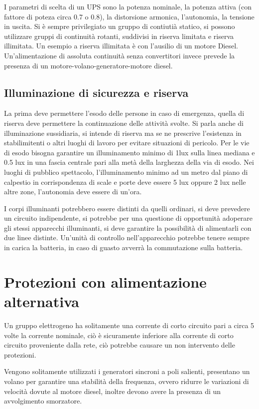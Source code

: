 I parametri di scelta di un UPS sono la potenza nominale, la potenza attiva 
(con fattore di poteza circa 0.7 o 0.8), la distorsione armonica, l'autonomia, 
la tensione in uscita.
Si è sempre privilegiato un gruppo di contiutià statico, si possono utilizzare 
gruppi di continuità rotanti, suddivisi in riserva limitata e riserva 
illimitata. Un esempio a riserva illimitata è con l'ausilio di un motore Diesel.
Un'alimentazione di assoluta continuità senza convertitori invece prevede la 
presenza di un motore-volano-generatore-motore diesel.

\subsection{Illuminazione di sicurezza e riserva}
La prima deve permettere l'esodo delle persone in caso di emergenza, quella di 
riserva deve permettere la continuazione delle attività svolte.
Si parla anche di illuminazione sussidiaria, si intende di riserva ma se ne 
prescrive l'esistenza in stabilimitenti o altri luoghi di lavoro per evitare 
situazioni di pericolo.
Per le vie di esodo bisogna garantire un illuminamento minimo di 1lux sulla 
linea mediana e 0.5 lux in una fascia centrale pari alla metà della larghezza 
della via di esodo. Nei luoghi di pubblico spettacolo, l'illuminamento minimo 
ad un metro dal piano di calpestio in corrispondenza di scale e porte deve 
essere 5 lux oppure 2 lux nelle altre zone, l'autonomia deve essere di un'ora.

I corpi illuminanti potrebbero essere distinti da quelli ordinari, si deve 
prevedere un circuito indipendente, si potrebbe per una questione di 
opportunità adoperare gli stessi apparecchi illuminanti, si deve garantire la 
possibilità di alimentarli con due linee distinte.
Un'unità di controllo nell'apparecchio potrebbe tenere sempre in carica la 
batteria, in caso di guasto avverrà la commutazione sulla batteria.

\section{Protezioni con alimentazione alternativa}

Un gruppo elettrogeno ha solitamente una corrente di corto circuito pari a 
circa 5 volte la corrente nominale, ciò è sicuramente inferiore alla corrente 
di corto circuito proveniente dalla rete, ciò potrebbe causare un non 
intervento delle protezioni.

Vengono solitamente utilizzati i generatori sincroni a poli salienti, 
presentano un volano per garantire una stabilità della frequenza, ovvero 
ridurre le variazioni di velocità dovute al motore diesel, inoltre devono avere 
la presenza di un avvolgimento smorzatore.

